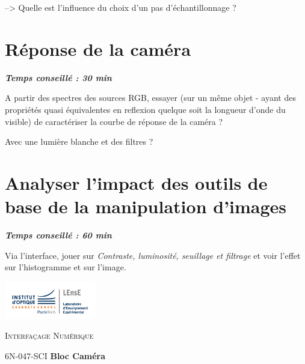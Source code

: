 \documentclass[a4paper,11pt,titlepage]{article} %
\begin{document}
--> Quelle est l'influence du choix d'un pas d'échantillonnage ?


\section{Réponse de la caméra}

\begin{center} \textbf{\textit{Temps conseillé : 30 min}} \end{center}

A partir des spectres des sources RGB, essayer (sur un même objet - ayant des propriétés quasi équivalentes en reflexion quelque soit la longueur d'onde du visible) de caractériser la courbe de réponse de la caméra ? 

Avec une lumière blanche et des filtres ?


\section{Analyser l'impact des outils de base de la manipulation d'images}

\begin{center} \textbf{\textit{Temps conseillé : 60 min}} \end{center}

Via l'interface, jouer sur \textit{Contraste, luminosité, seuillage et filtrage} et voir l'effet sur l'histogramme et sur l'image.

\newpage
\strut %
\begin{minipage}[c]{.25\linewidth}
	\includegraphics[width=4cm]{images/Logo-LEnsE.png}
\end{minipage} \hfill
\begin{minipage}[c]{.4\linewidth}

\begin{center}
\vspace{0.3cm}
{\Large \textsc{Interfaçage Numérique}}

\medskip

6N-047-SCI \qquad \textbf{\Large Bloc Caméra}

\end{center}
\end{minipage}\hfill
\end{document}

